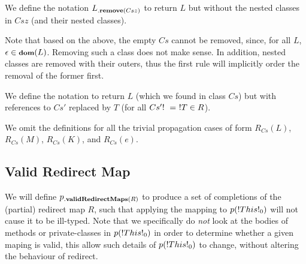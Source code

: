 We define the notation $L{{}_{.\textbf{remove}({Csz})}}$ to return $L$ but without the nested classes in $Csz$ (and their nested classes).

\begin{defs}
\end{defs}

Note that based on the above, the empty $Cs$ cannot be removed, since, for all $L$, $\epsilon \in {\ensuremath{\footnotesize{\textbf{dom}}({L})}}$. Removing such a class does not make sense. In addition, nested classes are removed with their outers, thus the first rule will implicitly order the removal of the former first.

We define the notation  to return $L$ (which we found in class $Cs$) but with references to $Cs'$ replaced by $T$ (for all $\redm{Cs'}{T} \in R$). 

\begin{defs}
\end{defs}

We omit the definitions for all the trivial propagation cases of form $R_{Cs}(L)$, $R_{Cs}(M)$, $R_{Cs}(K)$, and $R_{Cs}(e)$.

\subsection{Valid Redirect Map}


We will define $p{{}_{.\textbf{validRedirectMaps}({R})}}$ to produce a set of completions of the (partial) redirect map $R$, such that applying the mapping to $p(\This{0})$ will not cause it to be ill-typed. Note that we specifically do \emph{not} look at the bodies of methods or private-classes in $p(\This{0})$ in order to determine whether a given maping is valid, this allow such details of $p(\This{0})$ to change, without altering the behaviour of redirect.


